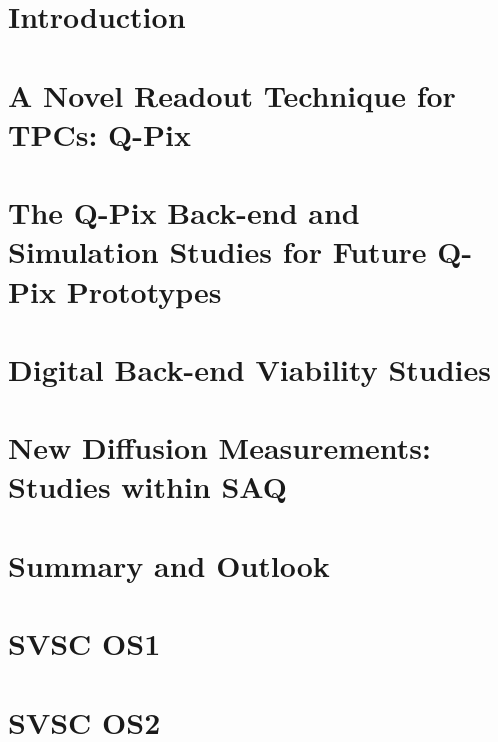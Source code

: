 \documentclass[12pt]{uh_thesis}
\begin{document}
\tableofcontents
\listoffigures
\listoftables
\printnomenclature

\mainmatter

\chapter{Introduction}
\label{chap:intro}


\chapter{A Novel Readout Technique for TPCs: Q-Pix}
\label{chap:qpix}


\chapter{The Q-Pix Back-end and Simulation Studies for Future Q-Pix Prototypes}
\label{chap:sim}


\chapter{Digital Back-end Viability Studies}
\label{chap:qdb}


\chapter{New Diffusion Measurements: Studies within SAQ}
\label{chap:saq}


\chapter{Summary and Outlook}
\label{chap:summary}


\printbibliography[heading=bibintoc]

\appendix
\chapter{SVSC OS1}
\label{chap:OS1}



\chapter{SVSC OS2}
\label{chap:OS2}



\printindex
\end{document}
